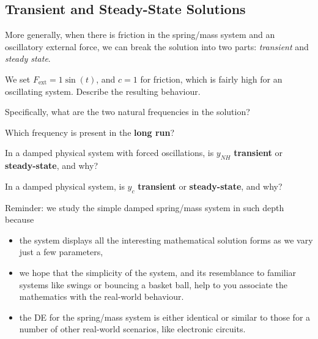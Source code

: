 \newpage

\subsection*{Transient and Steady-State Solutions}

More generally, when there is friction in the spring/mass system and
an oscillatory external force, we can break the solution into two
parts: {\em transient} and {\em steady state}.

We set $F_{\mbox{ext}} = 1 \sin(t)$, and $c = 1$ for friction, which is fairly
high for an oscillating system.  Describe the resulting behaviour.

\vfill

Specifically, what are the two natural frequencies in the solution?

\vfill

Which frequency is present in the {\bf long run}?

\vfill

\newpage

In a damped physical system with forced oscillations, is $y_{NH}$ {\bf
  transient} or {\bf steady-state}, and why?

\vfill

In a damped physical system, is $y_c$ {\bf transient} or {\bf
  steady-state}, and why?

\vfill

\newpage

Reminder: we study the simple damped spring/mass system in such depth
because
\begin{itemize}
\item the system displays all the interesting mathematical solution
  forms as we vary just a few parameters, 
\item we hope that the simplicity of the system, and its resemblance
  to familiar systems like swings or bouncing a basket ball, help to
  you associate the mathematics with the real-world behaviour.
\item the DE for the spring/mass system is either identical or similar
  to those for a number of other real-world scenarios, like electronic
  circuits.
\end{itemize}



